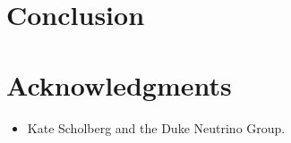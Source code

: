 \documentclass[12pt]{article}
\begin{document}
\section{Conclusion}


\section*{Acknowledgments}
\begin{itemize}
  \item[] Kate Scholberg and the Duke Neutrino Group.
\end{itemize}



\end{document}
